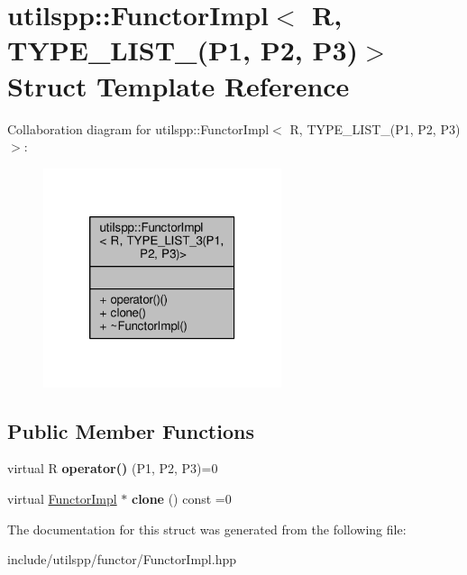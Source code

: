\hypertarget{structutilspp_1_1FunctorImpl_3_01R_00_01TYPE__LIST__3_07P1_00_01P2_00_01P3_08_4}{\section{utilspp\-:\-:Functor\-Impl$<$ R, T\-Y\-P\-E\-\_\-\-L\-I\-S\-T\-\_(P1, P2, P3)$>$ Struct Template Reference}
\label{structutilspp_1_1FunctorImpl_3_01R_00_01TYPE__LIST__3_07P1_00_01P2_00_01P3_08_4}
}


Collaboration diagram for utilspp\-:\-:Functor\-Impl$<$ R, T\-Y\-P\-E\-\_\-\-L\-I\-S\-T\-\_(P1, P2, P3)$>$\-:\nopagebreak
\begin{figure}[H]
\begin{center}
\leavevmode
\includegraphics[width=198pt]{structutilspp_1_1FunctorImpl_3_01R_00_01TYPE__LIST__3_07P1_00_01P2_00_01P3_08_4__coll__graph}
\end{center}
\end{figure}
\subsection*{Public Member Functions}
\begin{DoxyCompactItemize}
\item 
\hypertarget{structutilspp_1_1FunctorImpl_3_01R_00_01TYPE__LIST__3_07P1_00_01P2_00_01P3_08_4_aa0749bda9ec1d91d2cbc140eea74af55}{virtual R {\bfseries operator()} (P1, P2, P3)=0}\label{structutilspp_1_1FunctorImpl_3_01R_00_01TYPE__LIST__3_07P1_00_01P2_00_01P3_08_4_aa0749bda9ec1d91d2cbc140eea74af55}

\item 
\hypertarget{structutilspp_1_1FunctorImpl_3_01R_00_01TYPE__LIST__3_07P1_00_01P2_00_01P3_08_4_a056fa3f44af013aba8e0369a51020650}{virtual \hyperlink{structutilspp_1_1FunctorImpl}{Functor\-Impl} $\ast$ {\bfseries clone} () const =0}\label{structutilspp_1_1FunctorImpl_3_01R_00_01TYPE__LIST__3_07P1_00_01P2_00_01P3_08_4_a056fa3f44af013aba8e0369a51020650}

\end{DoxyCompactItemize}


The documentation for this struct was generated from the following file\-:\begin{DoxyCompactItemize}
\item 
include/utilspp/functor/Functor\-Impl.\-hpp\end{DoxyCompactItemize}

